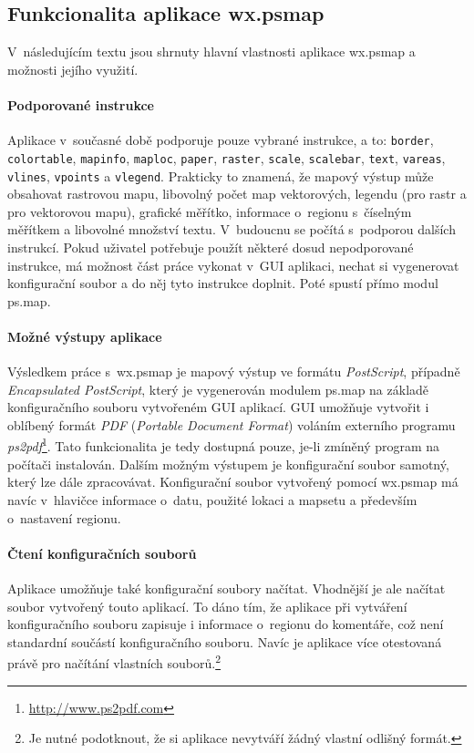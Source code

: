 \documentclass[a4paper,12pt,draft]{article}
\newcommand{\instr}[1]{\lstinline[style=psmapInline]|#1|}
\begin{document}
\subsection{Funkcionalita aplikace wx.psmap}
V~následujícím textu jsou shrnuty hlavní vlastnosti aplikace wx.psmap a
možnosti jejího využití.


\paragraph*{Podporované instrukce}
Aplikace v~současné době podporuje pouze vybrané instrukce, a to:
\instr{border}, \instr{colortable}, \instr{mapinfo}, \instr{maploc},
\instr{paper}, \instr{raster}, \instr{scale}, \instr{scalebar},
\instr{text}, \instr{vareas}, \instr{vlines}, \instr{vpoints} a
\instr{vlegend}. Prakticky to znamená, že mapový výstup může
obsahovat rastrovou mapu, libovolný počet map vektorových, legendu (pro
rastr a pro vektorovou mapu), grafické měřítko, informace o~regionu
s~číselným měřítkem a libovolné množství textu. V~budoucnu se
počítá s~podporou dalších instrukcí. Pokud uživatel potřebuje
použít některé dosud nepodporované instrukce, má možnost část
práce vykonat v~GUI aplikaci, nechat si vygenerovat konfigurační
soubor a do něj tyto instrukce doplnit. Poté spustí přímo modul ps.map.

\paragraph*{Možné výstupy aplikace}
Výsledkem práce s~wx.psmap je mapový výstup ve formátu \emph{PostScript},
případně \emph{Encapsulated PostScript}, který je vygenerován modulem
ps.map na základě konfiguračního souboru vytvořeném GUI
aplikací. GUI umožňuje vytvořit i oblíbený formát \emph{PDF} (\emph{Portable
Document Format}) voláním externího programu
\emph{ps2pdf}\footnote{\url{http://www.ps2pdf.com}}. Tato funkcionalita je tedy
dostupná pouze, je-li zmíněný program na počítači instalován. Dalším možným
výstupem je konfigurační soubor samotný,
který lze dále zpracovávat. Konfigurační soubor vytvořený pomocí
wx.psmap má navíc v~hlavičce informace o~datu, použité lokaci a
mapsetu a především o~nastavení regionu.

\paragraph*{Čtení konfiguračních souborů}
Aplikace umožňuje také konfigurační soubory načítat. Vhodnější
je ale načítat soubor vytvořený touto aplikací. To dáno tím, že
aplikace při vytváření konfiguračního souboru zapisuje i informace
o~regionu do komentáře, což není standardní součástí konfiguračního
souboru. Navíc je aplikace více otestovaná právě pro načítání
vlastních souborů.\footnote{Je nutné podotknout, že si aplikace nevytváří
žádný vlastní odlišný formát.}
\end{document}
